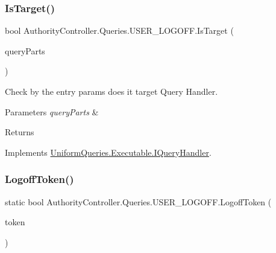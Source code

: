 \subsubsection{\texorpdfstring{Is\+Target()}{IsTarget()}}
{\footnotesize\ttfamily bool Authority\+Controller.\+Queries.\+U\+S\+E\+R\+\_\+\+L\+O\+G\+O\+F\+F.\+Is\+Target (\begin{DoxyParamCaption}\item[{\mbox{\hyperlink{struct_uniform_queries_1_1_query_part}{Query\+Part}} \mbox{[}$\,$\mbox{]}}]{query\+Parts }\end{DoxyParamCaption})}



Check by the entry params does it target Query Handler. 


\begin{DoxyParams}{Parameters}
{\em query\+Parts} & \\
\hline
\end{DoxyParams}
\begin{DoxyReturn}{Returns}

\end{DoxyReturn}


Implements \mbox{\hyperlink{interface_uniform_queries_1_1_executable_1_1_i_query_handler_a0f43184bf3e306a7cbebc39098f044ee}{Uniform\+Queries.\+Executable.\+I\+Query\+Handler}}.

\mbox{\label{class_authority_controller_1_1_queries_1_1_u_s_e_r___l_o_g_o_f_f_aee1aba51496e1412706f77c53650955a}} 
\subsubsection{\texorpdfstring{Logoff\+Token()}{LogoffToken()}}
{\footnotesize\ttfamily static bool Authority\+Controller.\+Queries.\+U\+S\+E\+R\+\_\+\+L\+O\+G\+O\+F\+F.\+Logoff\+Token (\begin{DoxyParamCaption}\item[{string}]{token }\end{DoxyParamCaption})\hspace{0.3cm}{\ttfamily [static]}}



